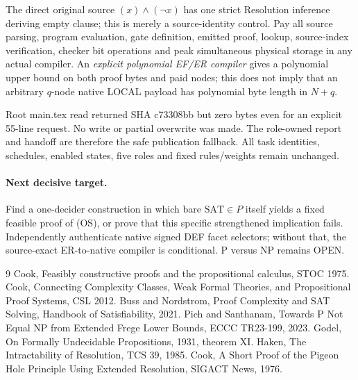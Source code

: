 \documentclass[11pt]{article}
\begin{document}
The direct original source $(x)\wedge(\neg x)$ has one strict Resolution inference deriving empty clause; this is merely a source-identity control. Pay all source parsing, program evaluation, gate definition, emitted proof, lookup, source-index verification, checker bit operations and peak simultaneous physical storage in any actual compiler. An \emph{explicit polynomial EF/ER compiler} gives a polynomial upper bound on both proof bytes and paid nodes; this does not imply that an arbitrary $q$-node native LOCAL payload has polynomial byte length in $N+q$.

Root main.tex read returned SHA c73308bb but zero bytes even for an explicit 55-line request. No write or partial overwrite was made. The role-owned report and handoff are therefore the safe publication fallback. All task identities, schedules, enabled states, five roles and fixed rules/weights remain unchanged.

\paragraph{Next decisive target.}
Find a one-decider construction in which bare $\mathrm{SAT}\in P$ itself yields a fixed feasible proof of (OS), or prove that this specific strengthened implication fails. Independently authenticate native signed DEF facet selectors; without that, the source-exact ER-to-native compiler is conditional. P versus NP remains OPEN.

\begin{thebibliography}{9}
 Cook, Feasibly constructive proofs and the propositional calculus, STOC 1975.
 Cook, Connecting Complexity Classes, Weak Formal Theories, and Propositional Proof Systems, CSL 2012.
 Buss and Nordstrom, Proof Complexity and SAT Solving, Handbook of Satisfiability, 2021.
 Pich and Santhanam, Towards P Not Equal NP from Extended Frege Lower Bounds, ECCC TR23-199, 2023.
 Godel, On Formally Undecidable Propositions, 1931, theorem XI.
 Haken, The Intractability of Resolution, TCS 39, 1985.
 Cook, A Short Proof of the Pigeon Hole Principle Using Extended Resolution, SIGACT News, 1976.
\end{thebibliography}
\end{document}
